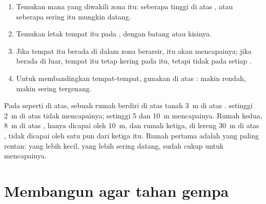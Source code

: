 \begin{method}
\begin{enumerate}
  \item Temukan  mana yang diwakili zona itu: seberapa tinggi di atas
        , atau seberapa sering  itu mungkin datang.
  \item Temukan letak tempat itu pada , dengan batang  atau
        kisinya.
  \item Jika tempat itu berada di dalam zona berarsir,  itu akan
        mencapainya; jika berada di luar, tempat itu tetap kering pada
         itu, tetapi tidak pada setiap .
  \item Untuk membandingkan tempat-tempat, gunakan  di atas
        : makin rendah, makin sering tergenang.
\end{enumerate}
\end{method}

\begin{example}
Pada  seperti  di atas, sebuah rumah berdiri di atas tanah
\qty{3}{m} di atas .  setinggi \qty{2}{m} di atas 
tidak mencapainya;  setinggi 5 dan \qty{10}{m} mencapainya. Rumah
kedua, \qty{8}{m} di atas , hanya dicapai oleh  \qty{10}{m},
dan rumah ketiga, di lereng \qty{30}{m} di atas , tidak dicapai oleh
satu pun dari ketiga  itu. Rumah pertama adalah yang paling rentan:
 yang lebih kecil, yang lebih sering datang, sudah cukup untuk
mencapainya.
\end{example}

\section{Membangun agar tahan gempa}

